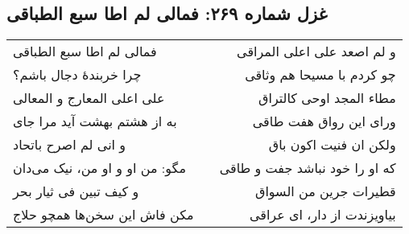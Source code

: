\begin{center}
\section*{غزل شماره ۲۶۹: فمالی لم اطا سبع الطباقی}
\label{sec:269}
\begin{longtable}{l p{0.5cm} r}
فمالی لم اطا سبع الطباقی
&&
و لم اصعد علی اعلی المراقی
\\
چرا خربندهٔ دجال باشم؟
&&
چو کردم با مسیحا هم وثاقی
\\
علی اعلی المعارج و المعالی
&&
مطاء المجد اوحی کالتراق
\\
به از هشتم بهشت آید مرا جای
&&
ورای این رواق هفت طاقی
\\
و انی لم اصرح باتحاد
&&
ولکن ان فنیت اکون باق
\\
مگو: من او و او من، نیک می‌دان
&&
که او را خود نباشد جفت و طاقی
\\
و کیف تبین فی ثیار بحر
&&
قطیرات جرین من السواق
\\
مکن فاش این سخن‌ها همچو حلاج
&&
بیاویزندت از دار، ای عراقی
\\
\end{longtable}
\end{center}
